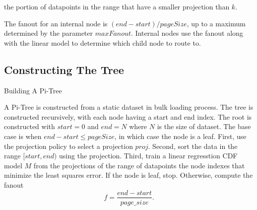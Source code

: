 \documentclass[sigconf,10pt]{acmart}
\begin{document}
the portion of datapoints in the range that have a 
smaller projection than $k$.

The fanout for an internal node is $(end - start) / pageSize$, up to a maximum determined
by the parameter $maxFanout$. Internal nodes use the fanout along with the linear model
to determine which child node to route to.

\subsection{Constructing The Tree}

\begin{algorithm}
  \caption{Building A Pi-Tree}
\end{algorithm}

A Pi-Tree is constructed from a static dataset in bulk loading process.
The tree is constructed recursively, with each node having a start and 
end index. The root is constructed with $start=0$ and $end=N$ where $N$
is the size of dataset. The base case is when $end - start \leq pageSize$,
in which case the node is a leaf.
First, use the projection policy to select a projection $proj$.
Second, sort the data in the range $[start, end)$ using the projection.
Third, train a linear regresstion CDF model $M$ from the projections of the range of datapoints
the node indexes that minimize the least squares error. If the node is leaf, stop. Otherwise,
compute the fanout
\[
  f = \frac{end - start}{page\_size}.
\]
\end{document}
